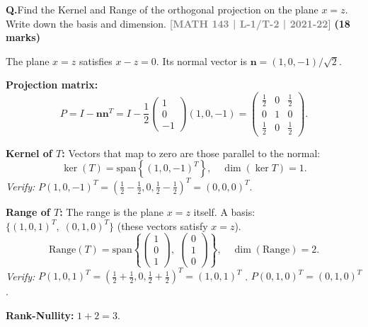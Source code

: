 \documentclass[12pt,a3paper]{article}
\newcommand{\yr}[1]{\hfill\textcolor{gray}{\small\textbf{[#1]}}}
\newcommand{\mk}[1]{\textcolor{orange!70!black}{\small\textbf{(#1 marks)}}}
\newcounter{qnum}
\newcommand{\Q}[1]{%
  \needspace{4\baselineskip}
  \refstepcounter{qnum}
  \vspace{6pt}
  \noindent\textbf{Q\theqnum.}\enspace #1\par
}
\begin{document}
\Q{Find the Kernel and Range of the orthogonal projection on the plane $x = z$. Write down the basis and dimension.
\yr{MATH 143 | L-1/T-2 | 2021-22} \mk{18}}


\begin{tcolorbox}[enhanced,breakable,
  colback=cF!4,colframe=cF,boxrule=0.8pt,arc=5pt,
  title={\textbf{Answer --- Kernel \& Range of Projection onto Plane $x=z$ in $\mathbb{R}^3$}},
  fonttitle=\bfseries\color{white},colbacktitle=cF]

The plane $x=z$ satisfies $x-z=0$. Its normal vector is $\mathbf{n}=(1,0,-1)/\sqrt{2}$.

\textbf{Projection matrix:}
\[
P=I-\mathbf{n}\mathbf{n}^T=I-\frac{1}{2}\begin{pmatrix}1\\0\\-1\end{pmatrix}(1,0,-1)
=\begin{pmatrix}\frac{1}{2}&0&\frac{1}{2}\\0&1&0\\\frac{1}{2}&0&\frac{1}{2}\end{pmatrix}.
\]

\textbf{Kernel of $T$:} Vectors that map to zero are those parallel to the normal:
\[
\ker(T)=\mathrm{span}\!\left\{(1,0,-1)^T\right\},\quad\dim(\ker T)=1.
\]
\textit{Verify:} $P(1,0,-1)^T=(\tfrac{1}{2}-\tfrac{1}{2},0,\tfrac{1}{2}-\tfrac{1}{2})^T=(0,0,0)^T$. \checkmark

\textbf{Range of $T$:} The range is the plane $x=z$ itself.
A basis: $\{(1,0,1)^T,\;(0,1,0)^T\}$ (these vectors satisfy $x=z$).
\[
\mathrm{Range}(T)=\mathrm{span}\!\left\{\begin{pmatrix}1\\0\\1\end{pmatrix},\;\begin{pmatrix}0\\1\\0\end{pmatrix}\right\},\quad\dim(\mathrm{Range})=2.
\]
\textit{Verify:} $P(1,0,1)^T=(\tfrac{1}{2}+\tfrac{1}{2},0,\tfrac{1}{2}+\tfrac{1}{2})^T=(1,0,1)^T$ \checkmark.
$P(0,1,0)^T=(0,1,0)^T$ \checkmark.

\textbf{Rank-Nullity:} $1+2=3$. \checkmark

\end{tcolorbox}
\end{document}
